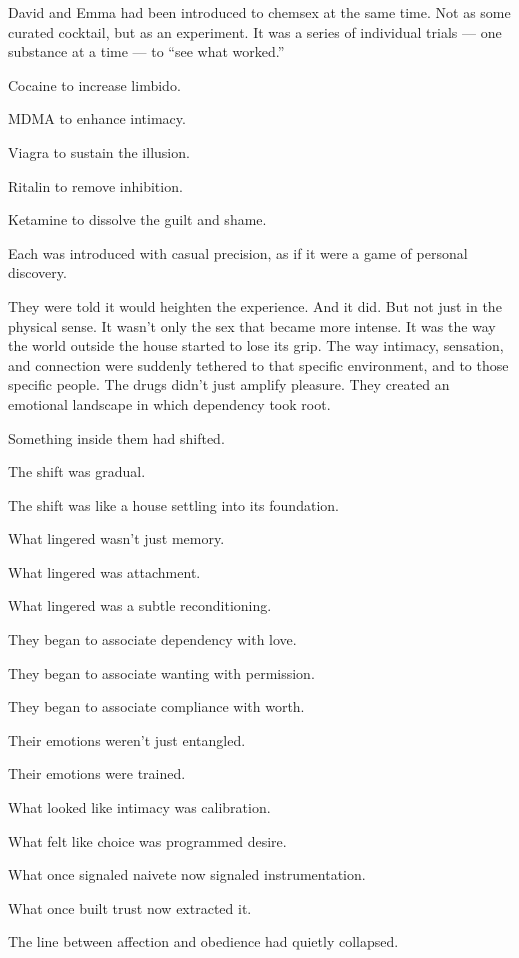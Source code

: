 \medskip

David and Emma had been introduced to chemsex at the same time. Not as some curated cocktail, but as an experiment. 
It was a series of individual trials --- one substance at a time --- to ``see what worked.'' 

Cocaine to increase limbido. 

MDMA to enhance intimacy. 

Viagra to sustain the illusion. 

Ritalin to remove inhibition. 

Ketamine to dissolve the guilt and shame. 

Each was introduced with casual precision, as if it were a game of personal discovery.

They were told it would heighten the experience. And it did. But not just in the physical sense. It wasn’t only 
the sex that became more intense. It was the way the world outside the house started to lose its grip. 
The way intimacy, sensation, and connection were suddenly tethered to that specific environment, and to those 
specific people. The drugs didn’t just amplify pleasure. They created an emotional landscape in which 
dependency took root.

Something inside them had shifted. 

The shift was gradual. 

The shift was like a house settling into its foundation. 

What lingered wasn’t just memory. 

What lingered was attachment. 

What lingered was a subtle reconditioning. 

They began to associate dependency with love. 

They began to associate wanting with permission.

They began to associate compliance with worth.

Their emotions weren’t just entangled. 

Their emotions were trained.

What looked like intimacy was calibration.

What felt like choice was programmed desire.

What once signaled naivete now signaled instrumentation.

What once built trust now extracted it.

The line between affection and obedience had quietly collapsed.

